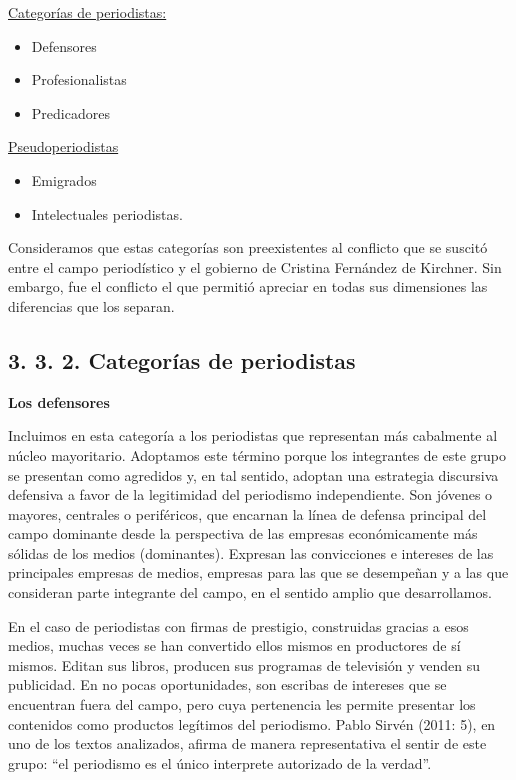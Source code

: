 {\ul{Categorías de periodistas:}

\begin{itemize}
\item
  Defensores
\item
  Profesionalistas
\item
  Predicadores
\end{itemize}

\ul{Pseudoperiodistas}

\begin{itemize}
\item
  Emigrados
\item
  Intelectuales periodistas.
\end{itemize}

Consideramos que estas categorías son preexistentes al conflicto que se suscitó entre el campo periodístico y el gobierno de Cristina Fernández de Kirchner. Sin embargo, fue el conflicto el que permitió apreciar en todas sus dimensiones las diferencias que los separan.

\subsection{3. 3. 2. Categorías de periodistas}

\textbf{Los defensores}

Incluimos en esta categoría a los periodistas que representan más cabalmente al núcleo mayoritario. Adoptamos este término porque los integrantes de este grupo se presentan como agredidos y, en tal sentido, adoptan una estrategia discursiva defensiva a favor de la legitimidad del periodismo independiente. Son jóvenes o mayores, centrales o periféricos, que encarnan la línea de defensa principal del campo dominante desde la perspectiva de las empresas económicamente más sólidas de los medios (dominantes). Expresan las convicciones e intereses de las principales empresas de medios, empresas para las que se desempeñan y a las que consideran parte integrante del campo, en el sentido amplio que desarrollamos.

En el caso de periodistas con firmas de prestigio, construidas gracias a esos medios, muchas veces se han convertido ellos mismos en productores de sí mismos. Editan sus libros, producen sus programas de televisión y venden su publicidad. En no pocas oportunidades, son escribas de intereses que se encuentran fuera del campo, pero cuya pertenencia les permite presentar los contenidos como productos legítimos del periodismo. Pablo Sirvén (2011: 5), en uno de los textos analizados, afirma de manera representativa el sentir de este grupo: \enquote{el periodismo es el único interprete autorizado de la verdad}.

}
